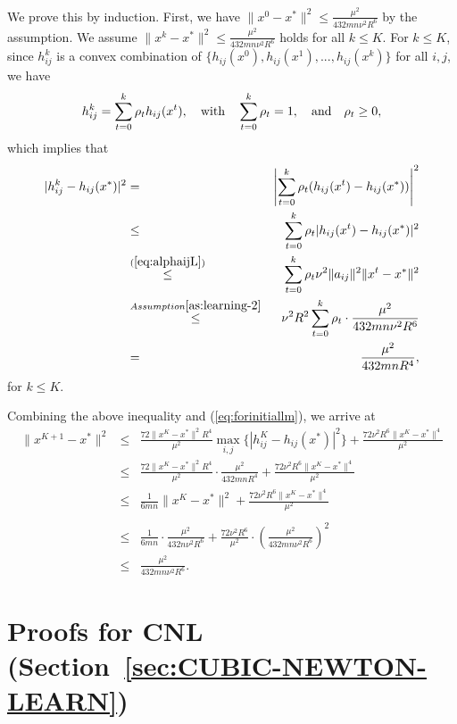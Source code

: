 \documentclass[12pt]{article}
\newcommand{\newalpha}{h}
\begin{document}
We prove this by induction. First, we have $\|x^0 - x^*\|^2 \leq \frac{\mu^2}{432mn \nu^2R^6}$ by the assumption. We assume $\|x^k - x^*\|^2 \leq \frac{\mu^2}{432mn \nu^2R^6}$ holds for all $k \leq K$. For $k\leq K$, since $h_{ij}^k$ is a convex combination of $\{  \newalpha_{ij}(x^0), \newalpha_{ij}(x^1), ..., \newalpha_{ij}(x^k)  \}$ for all $i,j$, we have 
$$
h_{ij}^k = \sum_{t=0}^k \rho_t \newalpha_{ij}(x^t), \quad {\rm with}\quad  \sum_{t=0}^k\rho_t = 1, \quad {\rm and} \quad \rho_t \geq 0, 
$$
which implies that 
\begin{eqnarray*}
	|h_{ij}^k - \newalpha_{ij}(x^*)|^2 &=&   \left|  \sum_{t=0}^k \rho_t (\newalpha_{ij}(x^t) - \newalpha_{ij}(x^*))  \right|^2 \\ 
	&\leq&   \sum_{t=0}^k \rho_t | \newalpha_{ij}(x^t) - \newalpha_{ij}(x^*) |^2 \\ 
	&\overset{(\ref{eq:alphaijL})}{\leq}&   \sum_{t=0}^k \rho_t \nu^2 \|a_{ij}\|^2 \|x^t - x^*\|^2 \\ 
	&\overset{Assumption \ref{as:learning-2}}{\leq}& \nu^2 R^2  \sum_{t=0}^k \rho_t \cdot \frac{\mu^2}{432mn \nu^2R^6} \\
	&=& \frac{ \mu^2}{432mnR^4}, 
\end{eqnarray*}
for $k\leq K$. 

Combining the above inequality and (\ref{eq:forinitiallm}), we arrive at 
\begin{eqnarray*}
	\|x^{K+1} - x^*\|^2 &\leq& \frac{72\|x^K-x^*\|^2 R^4}{\mu^2} \max_{i, j} \{  | h_{ij}^K - \newalpha_{ij}(x^*) |^2  \}  + \frac{ 72\nu^2 R^6\|x^K-x^*\|^4}{\mu^2} \\
	&\leq& \frac{72\|x^K-x^*\|^2 R^4}{\mu^2} \cdot  \frac{ \mu^2}{432mnR^4} +  \frac{ 72\nu^2 R^6\|x^K-x^*\|^4}{\mu^2} \\
	&\leq& \frac{1}{6mn}\|x^K - x^*\|^2 + \frac{ 72\nu^2 R^6\|x^K-x^*\|^4}{\mu^2} \\ \\
	&\leq& \frac{1}{6mn} \cdot \frac{\mu^2}{432n \nu^2R^6} + \frac{72 \nu^2 R^6}{\mu^2} \cdot \left(\frac{\mu^2}{432mn \nu^2R^6} \right)^2 \\ 
	&\leq& \frac{\mu^2}{432mn \nu^2R^6}. 
\end{eqnarray*}

\clearpage








\section{Proofs for {\sf CNL} (Section~\ref{sec:CUBIC-NEWTON-LEARN})}
\end{document}
